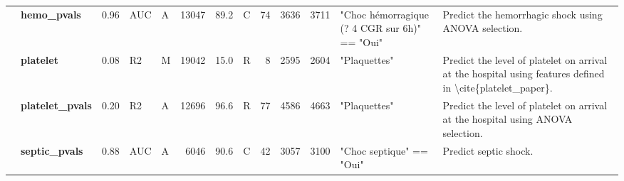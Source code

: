 \begin{tabular}{llrllrrlrrrll}
     & \textbf{hemo\_pvals} &   0.96 &    AUC &         A &   13047 &   89.2 &    C &                   74 &             3636 &            3711 &                                                                                                                                                                                                                                                                                                                                                                                                                                         "Choc hémorragique (? 4 CGR sur 6h)" == "Oui" &                                                               Predict the hemorrhagic shock using ANOVA selection. \\
     & \textbf{platelet} &   0.08 &     R2 &         M &   19042 &   15.0 &    R &                    8 &             2595 &            2604 &                                                                                                                                                                                                                                                                                                                                                                                                                                                                          "Plaquettes" &          Predict the level of platelet on arrival at the hospital using features defined in \textbackslash cite\{platelet\_paper\}. \\
     & \textbf{platelet\_pvals} &   0.20 &     R2 &         A &   12696 &   96.6 &    R &                   77 &             4586 &            4663 &                                                                                                                                                                                                                                                                                                                                                                                                                                                                          "Plaquettes" &                                    Predict the level of platelet on arrival at the hospital using ANOVA selection. \\
     & \textbf{septic\_pvals} &   0.88 &    AUC &         A &    6046 &   90.6 &    C &                   42 &             3057 &            3100 &                                                                                                                                                                                                                                                                                                                                                                                                                                                              "Choc septique" == "Oui" &                                                                                              Predict septic shock. \\

\end{tabular}
